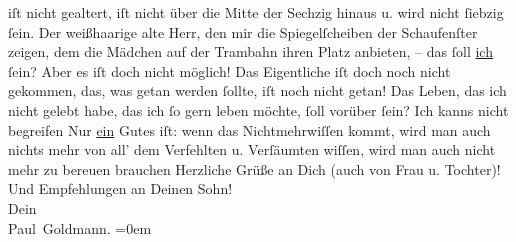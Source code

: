 \begin{ledgroupsized}[t]{13cm}
               iſt nicht gealtert, {\pb}iſt nicht über die Mitte
               der Sechzig hinaus u. wird nicht ſiebzig ſein. Der weißhaarige alte Herr, den mir die
               Spiegelſcheiben der Schaufenſter zeigen, dem die Mädchen auf der Trambahn ihren Platz
               anbieten, – das ſoll \uline{ich} ſein? Aber es iſt doch nicht
               möglich! Das Eigentliche iſt doch noch nicht gekommen, das, was getan werden ſollte,
               iſt noch nicht getan! Das Leben, das ich nicht gelebt habe, das ich ſo gern leben
               möchte, ſoll vorüber ſein? Ich kanns nicht begreifen{\dotsfive}\pend
           \pstart
           {\pb}Nur \uline{ein} Gutes
               iſt: wenn das \strikeout{\textcolor{gray}{gramſte}} Nichtmehrwiſſen kommt, wird man auch nichts mehr von all’ dem Verfehlten u.
               Verſäumten wiſſen, wird man auch nicht mehr zu bereuen brauchen{\dotsfive}\pend
           \pstart
           Herzliche Grüße an Dich (auch von Frau u. Tochter)! Und Empfehlungen an Deinen Sohn! {\\[\baselineskip]}Dein {\\[\baselineskip]}\spacefill\mbox{Paul Goldmann.}\pend
           \leftskip=0em{}
         
         \endnumbering{}\end{ledgroupsized}  \newcommand{\dateiname}{L03482}\newcommand{\titel}{Paul Goldmann an Arthur Schnitzler, 16. 8. 1930}\newcommand{\editorInnen}{Martin Anton Müller und Laura Untner}
      